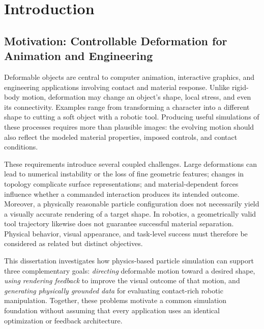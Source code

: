 
\chapter{Introduction}
\label{CH1_Introduction}

\section{Motivation: Controllable Deformation for Animation and Engineering}
    Deformable objects are central to computer animation, interactive graphics, and engineering applications involving contact and material response. Unlike rigid-body motion, deformation may change an object's shape, local stress, and even its connectivity. Examples range from transforming a character into a different shape to cutting a soft object with a robotic tool. Producing useful simulations of these processes requires more than plausible images: the evolving motion should also reflect the modeled material properties, imposed controls, and contact conditions.
    
    These requirements introduce several coupled challenges. Large deformations can lead to numerical instability or the loss of fine geometric features; changes in topology complicate surface representations; and material-dependent forces influence whether a commanded interaction produces its intended outcome. Moreover, a physically reasonable particle configuration does not necessarily yield a visually accurate rendering of a target shape. In robotics, a geometrically valid tool trajectory likewise does not guarantee successful material separation. Physical behavior, visual appearance, and task-level success must therefore be considered as related but distinct objectives.
    
    This dissertation investigates how physics-based particle simulation can support three complementary goals: \emph{directing} deformable motion toward a desired shape, \emph{using rendering feedback} to improve the visual outcome of that motion, and \emph{generating physically grounded data} for evaluating contact-rich robotic manipulation. Together, these problems motivate a common simulation foundation without assuming that every application uses an identical optimization or feedback architecture.

